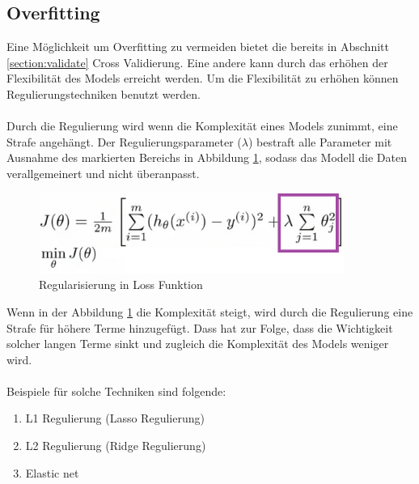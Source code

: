 \documentclass[12pt,oneside,a4paper,parskip]{scrbook}
\begin{document}
\subsection{Overfitting}

Eine Möglichkeit um Overfitting zu vermeiden bietet die bereits in Abschnitt \ref{section:validate} Cross Validierung. Eine andere kann durch das erhöhen der Flexibilität des Models erreicht werden. Um die Flexibilität zu erhöhen können Regulierungstechniken benutzt werden.
\\\\
Durch die Regulierung wird wenn die Komplexität eines Models zunimmt, eine Strafe angehängt. Der Regulierungsparameter (${\lambda}$) bestraft alle Parameter mit Ausnahme des markierten Bereichs in Abbildung \ref{fig:regFunc}, sodass das Modell die Daten verallgemeinert und nicht überanpasst.

\begin{figure}[h]
	\begin{center}
		\includegraphics[width=10cm]{Bilder/regFunc.png}
		\caption{Regularisierung in Loss Funktion}
		\label{fig:regFunc}
	\end{center}
\end{figure}

Wenn in der Abbildung \ref{fig:regFunc} die Komplexität steigt, wird durch die Regulierung eine Strafe für höhere Terme hinzugefügt. Dass hat zur Folge, dass die Wichtigkeit solcher langen Terme sinkt und zugleich die Komplexität des Models weniger wird.
\\\\
Beispiele für solche Techniken sind folgende:

\begin{enumerate}
	\item L1 Regulierung (Lasso Regulierung)
	\item L2 Regulierung (Ridge Regulierung)
	\item Elastic net
\end{enumerate}
\end{document}
